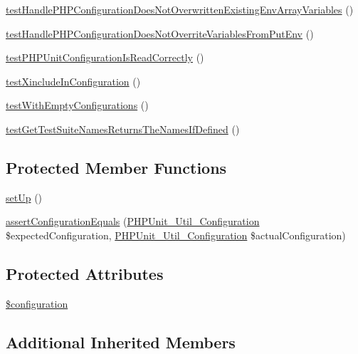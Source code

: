 \begin{DoxyCompactItemize}
\mbox{\hyperlink{class_util___configuration_test_a9822fb506c7393f259ea497064b57d49}{test\+Handle\+P\+H\+P\+Configuration\+Does\+Not\+Overwritten\+Existing\+Env\+Array\+Variables}} ()
\item 
\mbox{\hyperlink{class_util___configuration_test_a299298565b319d85303e4380548900d0}{test\+Handle\+P\+H\+P\+Configuration\+Does\+Not\+Overrite\+Variables\+From\+Put\+Env}} ()
\item 
\mbox{\hyperlink{class_util___configuration_test_a91bba33810b19069ed9a27883eae4a40}{test\+P\+H\+P\+Unit\+Configuration\+Is\+Read\+Correctly}} ()
\item 
\mbox{\hyperlink{class_util___configuration_test_acffe4a69ad53c0d40b6ac5432913073e}{test\+Xinclude\+In\+Configuration}} ()
\item 
\mbox{\hyperlink{class_util___configuration_test_aa7563d6793afb447f0cf9ea4d95bffc9}{test\+With\+Empty\+Configurations}} ()
\item 
\mbox{\hyperlink{class_util___configuration_test_a4895308b97b093e58357879904221e41}{test\+Get\+Test\+Suite\+Names\+Returns\+The\+Names\+If\+Defined}} ()
\end{DoxyCompactItemize}
\subsection*{Protected Member Functions}
\begin{DoxyCompactItemize}
\item 
\mbox{\hyperlink{class_util___configuration_test_a0bc688732d2b3b162ffebaf7812e78da}{set\+Up}} ()
\item 
\mbox{\hyperlink{class_util___configuration_test_a1f7c9084406ea4e1fc6cfecbdc509d12}{assert\+Configuration\+Equals}} (\mbox{\hyperlink{class_p_h_p_unit___util___configuration}{P\+H\+P\+Unit\+\_\+\+Util\+\_\+\+Configuration}} \$expected\+Configuration, \mbox{\hyperlink{class_p_h_p_unit___util___configuration}{P\+H\+P\+Unit\+\_\+\+Util\+\_\+\+Configuration}} \$actual\+Configuration)
\end{DoxyCompactItemize}
\subsection*{Protected Attributes}
\begin{DoxyCompactItemize}
\item 
\mbox{\hyperlink{class_util___configuration_test_ab2a3e8712b2462d01e8ebacaa08bafa7}{\$configuration}}
\end{DoxyCompactItemize}
\subsection*{Additional Inherited Members}


